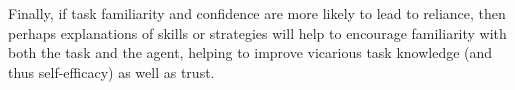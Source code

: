 \documentclass[letterpaper]{article} %
\begin{document}
Finally, if task familiarity and confidence are more likely to lead to reliance, then perhaps explanations of skills or strategies will help to encourage familiarity with both the task and the agent, helping to improve vicarious task knowledge (and thus self-efficacy) as well as trust.




\end{document}
